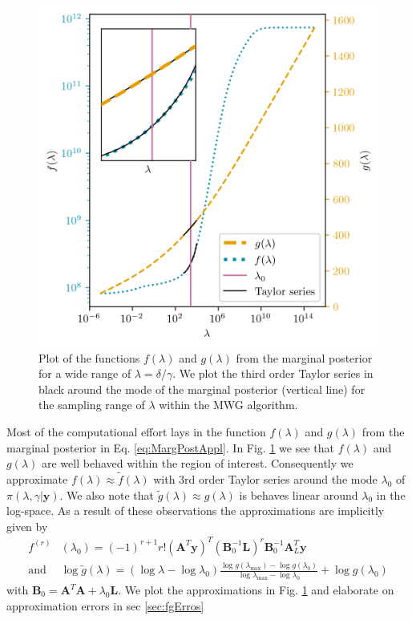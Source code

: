 \begin{figure}[ht!]
	\centering
	\includegraphics{f_and_g_phd.png}
	\caption[Plot of the functions $f(\lambda)$ and $g(\lambda)$ for marginal posterior.]{Plot of the functions $f(\lambda)$ and $g(\lambda)$ from the marginal posterior for a wide range of $\lambda = \delta / \gamma$. We plot the third order Taylor series in black around the mode of the marginal posterior (vertical line) for the sampling range of $\lambda$ within the MWG algorithm.}
	\label{fig:fandg}
\end{figure}
Most of the computational effort lays in the function $f(\lambda)$ and $g(\lambda)$ from the marginal posterior in Eq. \ref{eq:MargPostAppl}.
In  Fig. \ref{fig:fandg} we see that $f(\lambda)$ and $g(\lambda)$ are well behaved within the region of interest.
Consequently we approximate $f(\lambda) \approx \tilde{f}(\lambda)$ with 3rd order Taylor series around the mode $\lambda_0$ of $\pi(\lambda, \gamma | \bm{y})$.
We also note that $\tilde{g}(\lambda) \approx g(\lambda)$ is behaves linear around $\lambda_0$ in the log-space.
As a result of these observations the approximations are implicitly given by
\begin{align}
	f^{(r)}& (\lambda_0)= (-1)^{r+1} r! (\bm{A}^T \bm{y})^T (\bm{B}_0^{-1} \bm{L})^r \bm{B}_0^{-1} \bm{A}_L^T \bm{y} \label{eq:ftay}  \\
	\text{and } & \log{ \tilde{g}(\lambda)} = (\log{\lambda} - \log{\lambda_{0}})  \frac{ \log{g(\lambda_{\text{max}})} - \log{g(\lambda_{0})} }{\log{\lambda_{\text{max}}} - \log{\lambda_{0}} } + \log{ g(\lambda_{0})} 
	\label{eq:gtay}
\end{align} 
with $\bm{B}_0 = \bm{A}^T  \bm{A} + \lambda_0 \bm{L}$.
We plot the approximations in Fig. \ref{fig:fandg} and elaborate on approximation errors in sec \ref{sec:fgErros}







